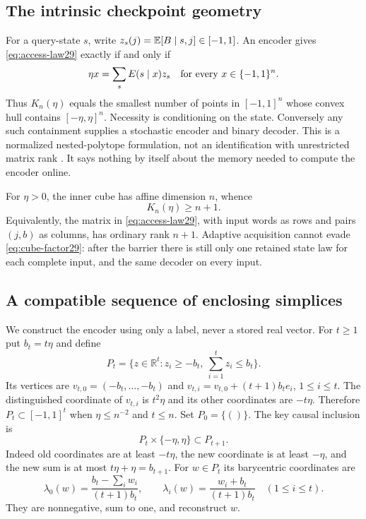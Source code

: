 \subsection{The intrinsic checkpoint geometry}
For a query-state $s$, write $z_s(j)=\mathbb E[B\mid s,j]\in[-1,1]$.
An encoder gives \eqref{eq:access-law29} exactly if and only if
\begin{equation}\label{eq:cube-factor29}
                     \eta x=\sum_s E(s\mid x)z_s
              \quad\hbox{for every }x\in\{-1,1\}^n.
\end{equation}
Thus $K_n(\eta)$ equals the smallest number of points in $[-1,1]^n$
whose convex hull contains $[-\eta,\eta]^n$. Necessity is conditioning
on the state. Conversely any such containment supplies a stochastic
encoder and binary decoder. This is a normalized nested-polytope
formulation, not an identification with unrestricted matrix rank
\cite{GG}. It says nothing by itself about the memory needed to compute
the encoder online.

For $\eta>0$, the inner cube has affine dimension $n$, whence
\begin{equation}\label{eq:access-rank29}
                          K_n(\eta)\ge n+1.
\end{equation}
Equivalently, the matrix in \eqref{eq:access-law29}, with input words
as rows and pairs $(j,b)$ as columns, has ordinary rank $n+1$.
Adaptive acquisition cannot evade \eqref{eq:cube-factor29}: after the
barrier there is still only one retained state law for each complete
input, and the same decoder on every input.

\subsection{A compatible sequence of enclosing simplices}
We construct the encoder using only a label, never a stored real vector.
For $t\ge1$ put $b_t=t\eta$ and define
\begin{equation}\label{eq:access-simplex29}
 P_t=\{z\in\mathbb R^t:z_i\ge-b_t,\ \sum_{i=1}^t z_i\le b_t\}.
\end{equation}
Its vertices are $v_{t,0}=(-b_t,\ldots,-b_t)$ and
$v_{t,i}=v_{t,0}+(t+1)b_t e_i$, $1\le i\le t$.
The distinguished coordinate of $v_{t,i}$ is $t^2\eta$ and its other
coordinates are $-t\eta$. Therefore $P_t\subset[-1,1]^t$ when
$\eta\le n^{-2}$ and $t\le n$. Set $P_0=\{()\}$.
The key causal inclusion is
\begin{equation}\label{eq:access-nesting29}
                    P_t\times\{-\eta,\eta\}\subset P_{t+1}.
\end{equation}
Indeed old coordinates are at least $-t\eta$, the new coordinate is at
least $-\eta$, and the new sum is at most $t\eta+\eta=b_{t+1}$.
For $w\in P_t$ its barycentric coordinates are
\begin{equation}\label{eq:access-bary29}
 \lambda_0(w)=\frac{b_t-\sum_iw_i}{(t+1)b_t},\qquad
 \lambda_i(w)=\frac{w_i+b_t}{(t+1)b_t}\quad(1\le i\le t).
\end{equation}
They are nonnegative, sum to one, and reconstruct $w$.


